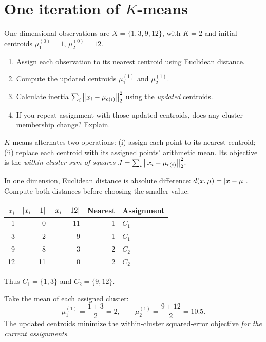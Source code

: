 \section{One iteration of $K$-means}
\label{sec:ex1}
\begin{problem}
One-dimensional observations are $X=\{1,3,9,12\}$, with $K=2$ and initial centroids $\mu_1^{(0)}=1$, $\mu_2^{(0)}=12$.
\begin{enumerate}[label=\textbf{(\alph*)}]
\item Assign each observation to its nearest centroid using Euclidean distance.
\item Compute the updated centroids $\mu_1^{(1)}$ and $\mu_2^{(1)}$.
\item Calculate inertia $\sum_i\left\lVert x_i-\mu_{c(i)}\right\rVert_2^2$ using the \emph{updated} centroids.
\item If you repeat assignment with those updated centroids, does any cluster membership change? Explain.
\end{enumerate}
\end{problem}


\begin{concept}
$K$-means alternates two operations: (i) assign each point to its nearest centroid; (ii) replace each centroid with its assigned points' arithmetic mean. Its objective is the \emph{within-cluster sum of squares} $J=\sum_i\left\lVert x_i-\mu_{c(i)}\right\rVert_2^2$.
\end{concept}

In one dimension, Euclidean distance is absolute difference: $d(x,\mu)=\left\lvert x-\mu\right\rvert$. Compute both distances before choosing the smaller value:
\begin{center}
\begin{tabular}{@{}rrrrl@{}}\toprule
$x_i$ & $\left\lvert x_i-1\right\rvert$ & $\left\lvert x_i-12\right\rvert$ & Nearest & Assignment\\\midrule
1&0&11&1&$C_1$\\
3&2&9&1&$C_1$\\
9&8&3&2&$C_2$\\
12&11&0&2&$C_2$\\\bottomrule
\end{tabular}
\end{center}
Thus $C_1=\{1,3\}$ and $C_2=\{9,12\}$.

Take the mean of each assigned cluster:
\[
\mu_1^{(1)}=\frac{1+3}{2}=\boxed{2},\qquad
\mu_2^{(1)}=\frac{9+12}{2}=\boxed{10.5}.
\]
The updated centroids minimize the within-cluster squared-error objective \emph{for the current assignments}.

